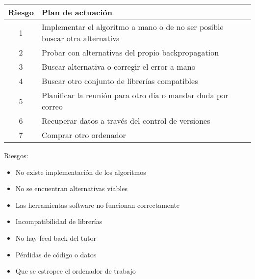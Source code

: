 \begin{table}[h]
\centering
\begin{tabular}{|c|l|}
\hline
\rowcolor[HTML]{C0C0C0} 
{\color[HTML]{000000} \textbf{Riesgo}} & {\color[HTML]{000000} \textbf{Plan de actuación}}                         \\ \hline
\rowcolor[HTML]{EFEFEF} 
{\color[HTML]{000000} 1} & {\color[HTML]{000000} Implementar el algoritmo a mano o de no ser posible buscar otra alternativa} \\ \hline
\rowcolor[HTML]{EFEFEF} 
{\color[HTML]{000000} 2}               & {\color[HTML]{000000} Probar con alternativas del propio backpropagation} \\ \hline
\rowcolor[HTML]{EFEFEF} 
{\color[HTML]{000000} 3}               & {\color[HTML]{000000} Buscar alternativa o corregir el error a mano}      \\ \hline
\rowcolor[HTML]{EFEFEF} 
{\color[HTML]{000000} 4}               & {\color[HTML]{000000} Buscar otro conjunto de librerías compatibles}      \\ \hline
\rowcolor[HTML]{EFEFEF} 
{\color[HTML]{000000} 5} & {\color[HTML]{000000} Planificar la reunión para otro día o mandar duda por correo}                \\ \hline
\rowcolor[HTML]{EFEFEF} 
{\color[HTML]{000000} 6}               & {\color[HTML]{000000} Recuperar datos a través del control de versiones}  \\ \hline
\rowcolor[HTML]{EFEFEF} 
{\color[HTML]{000000} 7}               & {\color[HTML]{000000} Comprar otro ordenador}                             \\ \hline
\end{tabular}
\end{table}

Riesgos:
\begin{itemize}
    \item No existe implementación de los algoritmos
    \item No se encuentran alternativas viables
    \item Las herramientas software no funcionan correctamente
    \item Incompatibilidad de librerías
    \item No hay feed back del tutor
    \item Pérdidas de código o datos
    \item Que se estropee el ordenador de trabajo
\end{itemize}


